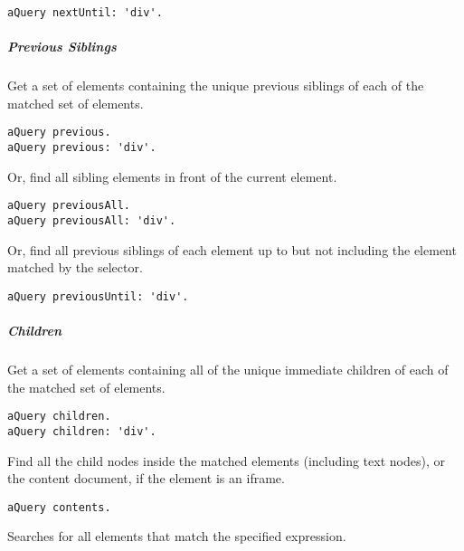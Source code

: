 \documentclass[a4paper,10pt,twoside]{book}
\begin{document}
\begin{lstlisting}
aQuery nextUntil: 'div'.
\end{lstlisting}

\subparagraph*{Previous Siblings}
\label{book:web20:jquery:basics:refiningqueries:13690263}
  Get a set of elements containing the unique previous siblings of each of the matched set of elements.

\begin{lstlisting}
aQuery previous.
aQuery previous: 'div'.
\end{lstlisting}

  Or, find all sibling elements in front of the current element.

\begin{lstlisting}
aQuery previousAll.
aQuery previousAll: 'div'.
\end{lstlisting}

 Or, find all previous siblings of each element up to but not including the element matched by the selector.

\begin{lstlisting}
aQuery previousUntil: 'div'.
\end{lstlisting}

\subparagraph*{Children}
\label{book:web20:jquery:basics:refiningqueries:121775888}
  Get a set of elements containing all of the unique immediate children of each of the matched set of elements.

\begin{lstlisting}
aQuery children.
aQuery children: 'div'.
\end{lstlisting}

 Find all the child nodes inside the matched elements (including text nodes), or the content document, if the element is an iframe.

\begin{lstlisting}
aQuery contents.
\end{lstlisting}

 Searches for all elements that match the specified expression.
\end{document}

